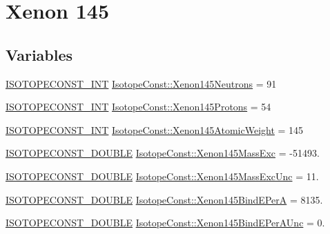 \hypertarget{group___isotope_const-_xenon-_xe145}{}\section{Xenon 145}
\label{group___isotope_const-_xenon-_xe145}
\subsection*{Variables}
\begin{DoxyCompactItemize}
\item 
\mbox{\hyperlink{group___isotope_const-_macros_ga5f18360b3e99483a35c32d789e62621c}{I\+S\+O\+T\+O\+P\+E\+C\+O\+N\+S\+T\+\_\+\+I\+NT}} \mbox{\hyperlink{group___isotope_const-_xenon-_xe145_ga22f96c982067e48fec2bf30f96f3c522}{Isotope\+Const\+::\+Xenon145\+Neutrons}} = 91
\item 
\mbox{\hyperlink{group___isotope_const-_macros_ga5f18360b3e99483a35c32d789e62621c}{I\+S\+O\+T\+O\+P\+E\+C\+O\+N\+S\+T\+\_\+\+I\+NT}} \mbox{\hyperlink{group___isotope_const-_xenon-_xe145_gad1b20fcbcf45bf971b9041a2c1a9127f}{Isotope\+Const\+::\+Xenon145\+Protons}} = 54
\item 
\mbox{\hyperlink{group___isotope_const-_macros_ga5f18360b3e99483a35c32d789e62621c}{I\+S\+O\+T\+O\+P\+E\+C\+O\+N\+S\+T\+\_\+\+I\+NT}} \mbox{\hyperlink{group___isotope_const-_xenon-_xe145_ga1e9fef62f46fb3b12b55c3e1479d4f3a}{Isotope\+Const\+::\+Xenon145\+Atomic\+Weight}} = 145
\item 
\mbox{\hyperlink{group___isotope_const-_macros_ga8f45a7272ce02c0b4c65c44636ed719a}{I\+S\+O\+T\+O\+P\+E\+C\+O\+N\+S\+T\+\_\+\+D\+O\+U\+B\+LE}} \mbox{\hyperlink{group___isotope_const-_xenon-_xe145_ga037b058fd89280f48d85411d3e30f4bc}{Isotope\+Const\+::\+Xenon145\+Mass\+Exc}} = -\/51493.
\item 
\mbox{\hyperlink{group___isotope_const-_macros_ga8f45a7272ce02c0b4c65c44636ed719a}{I\+S\+O\+T\+O\+P\+E\+C\+O\+N\+S\+T\+\_\+\+D\+O\+U\+B\+LE}} \mbox{\hyperlink{group___isotope_const-_xenon-_xe145_ga1ab6e49044ff59a7b406a9cf6fa0a4e9}{Isotope\+Const\+::\+Xenon145\+Mass\+Exc\+Unc}} = 11.
\item 
\mbox{\hyperlink{group___isotope_const-_macros_ga8f45a7272ce02c0b4c65c44636ed719a}{I\+S\+O\+T\+O\+P\+E\+C\+O\+N\+S\+T\+\_\+\+D\+O\+U\+B\+LE}} \mbox{\hyperlink{group___isotope_const-_xenon-_xe145_gab4a57c632b0ba3b25a3f6bc6139b22df}{Isotope\+Const\+::\+Xenon145\+Bind\+E\+PerA}} = 8135.
\item 
\mbox{\hyperlink{group___isotope_const-_macros_ga8f45a7272ce02c0b4c65c44636ed719a}{I\+S\+O\+T\+O\+P\+E\+C\+O\+N\+S\+T\+\_\+\+D\+O\+U\+B\+LE}} \mbox{\hyperlink{group___isotope_const-_xenon-_xe145_gad69c9e54f2d24b2015c3bed014a5a6a2}{Isotope\+Const\+::\+Xenon145\+Bind\+E\+Per\+A\+Unc}} = 0.

\end{DoxyCompactItemize}
